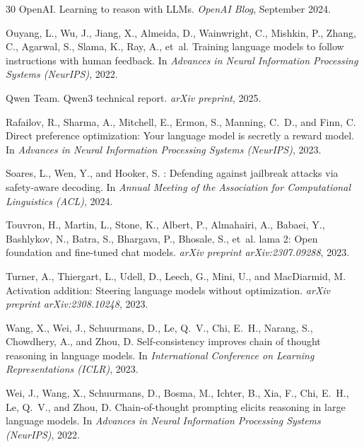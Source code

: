 \documentclass[11pt]{article}
\begin{document}
\begin{thebibliography}{30}
OpenAI.
\newblock Learning to reason with {LLMs}.
\newblock \emph{OpenAI Blog}, September 2024.

Ouyang, L., Wu, J., Jiang, X., Almeida, D., Wainwright, C., Mishkin, P., Zhang, C., Agarwal, S., Slama, K., Ray, A., et~al.
\newblock Training language models to follow instructions with human feedback.
\newblock In \emph{Advances in Neural Information Processing Systems (NeurIPS)}, 2022.

Qwen Team.
\newblock Qwen3 technical report.
\newblock \emph{arXiv preprint}, 2025.

Rafailov, R., Sharma, A., Mitchell, E., Ermon, S., Manning, C.~D., and Finn, C.
\newblock Direct preference optimization: Your language model is secretly a reward model.
\newblock In \emph{Advances in Neural Information Processing Systems (NeurIPS)}, 2023.

Soares, L., Wen, Y., and Hooker, S.
: Defending against jailbreak attacks via safety-aware decoding.
\newblock In \emph{Annual Meeting of the Association for Computational Linguistics (ACL)}, 2024.

Touvron, H., Martin, L., Stone, K., Albert, P., Almahairi, A., Babaei, Y., Bashlykov, N., Batra, S., Bhargava, P., Bhosale, S., et~al.
lama 2: Open foundation and fine-tuned chat models.
\newblock \emph{arXiv preprint arXiv:2307.09288}, 2023.

Turner, A., Thiergart, L., Udell, D., Leech, G., Mini, U., and MacDiarmid, M.
\newblock Activation addition: Steering language models without optimization.
\newblock \emph{arXiv preprint arXiv:2308.10248}, 2023.

Wang, X., Wei, J., Schuurmans, D., Le, Q.~V., Chi, E.~H., Narang, S., Chowdhery, A., and Zhou, D.
\newblock Self-consistency improves chain of thought reasoning in language models.
\newblock In \emph{International Conference on Learning Representations (ICLR)}, 2023.

Wei, J., Wang, X., Schuurmans, D., Bosma, M., Ichter, B., Xia, F., Chi, E.~H., Le, Q.~V., and Zhou, D.
\newblock Chain-of-thought prompting elicits reasoning in large language models.
\newblock In \emph{Advances in Neural Information Processing Systems (NeurIPS)}, 2022.


\end{thebibliography}
\end{document}

